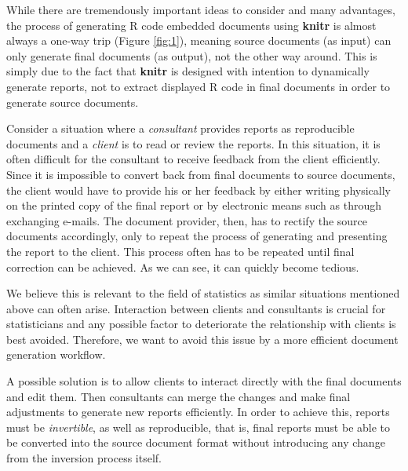 \documentclass[a4paper, 12pt]{report}
\begin{document}
While there are tremendously important ideas to consider and many advantages, the process of generating R code embedded documents using \textbf{knitr} is almost always a one-way trip (Figure \ref{fig:1}), meaning source documents (as input) can only generate final documents (as output), not the other way around. This is simply due to the fact that \textbf{knitr} is designed with intention to dynamically generate reports, not to extract displayed R code in final documents in order to generate source documents.

Consider a situation where a \emph{consultant} provides reports as reproducible documents and a \emph{client} is to read or review the reports. In this situation, it is often difficult for the consultant to receive feedback from the client efficiently. Since it is impossible to convert back from final documents to source documents, the client would have to provide his or her feedback by either writing physically on the printed copy of the final report or by electronic means such as through exchanging e-mails. The document provider, then, has to rectify the source documents accordingly, only to repeat the process of generating and presenting the report to the client. This process often has to be repeated until final correction can be achieved. As we can see, it can quickly become tedious.

We believe this is relevant to the field of statistics as similar situations mentioned above can often arise. Interaction between clients and consultants is crucial for statisticians and any possible factor to deteriorate the relationship with clients is best avoided. Therefore, we want to avoid this issue by a more efficient document generation workflow.

A possible solution is to allow clients to interact directly with the final documents and edit them. Then consultants can merge the changes and make final adjustments to generate new reports efficiently. In order to achieve this, reports must be \emph{invertible}, as well as reproducible, that is, final reports must be able to be converted into the source document format without introducing any change from the inversion process itself.
\end{document}
